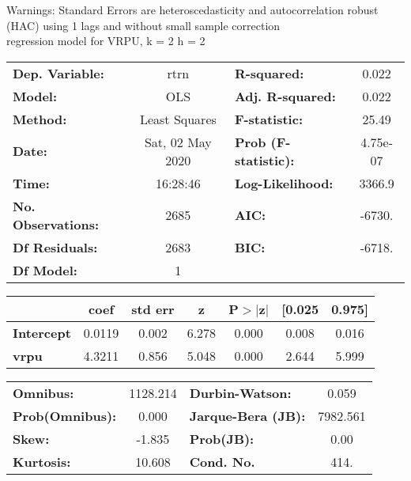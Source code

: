 Warnings: \newline
 [1] Standard Errors are heteroscedasticity and autocorrelation robust (HAC) using 1 lags and without small sample correction\\ 

regression model for VRPU, k = 2 h = 2\begin{center}
\begin{tabular}{lclc}
\toprule
\textbf{Dep. Variable:}    &       rtrn       & \textbf{  R-squared:         } &     0.022   \\
\textbf{Model:}            &       OLS        & \textbf{  Adj. R-squared:    } &     0.022   \\
\textbf{Method:}           &  Least Squares   & \textbf{  F-statistic:       } &     25.49   \\
\textbf{Date:}             & Sat, 02 May 2020 & \textbf{  Prob (F-statistic):} &  4.75e-07   \\
\textbf{Time:}             &     16:28:46     & \textbf{  Log-Likelihood:    } &    3366.9   \\
\textbf{No. Observations:} &        2685      & \textbf{  AIC:               } &    -6730.   \\
\textbf{Df Residuals:}     &        2683      & \textbf{  BIC:               } &    -6718.   \\
\textbf{Df Model:}         &           1      & \textbf{                     } &             \\
\bottomrule
\end{tabular}
\begin{tabular}{lcccccc}
                   & \textbf{coef} & \textbf{std err} & \textbf{z} & \textbf{P$> |$z$|$} & \textbf{[0.025} & \textbf{0.975]}  \\
\midrule
\textbf{Intercept} &       0.0119  &        0.002     &     6.278  &         0.000        &        0.008    &        0.016     \\
\textbf{vrpu}      &       4.3211  &        0.856     &     5.048  &         0.000        &        2.644    &        5.999     \\
\bottomrule
\end{tabular}
\begin{tabular}{lclc}
\textbf{Omnibus:}       & 1128.214 & \textbf{  Durbin-Watson:     } &    0.059  \\
\textbf{Prob(Omnibus):} &   0.000  & \textbf{  Jarque-Bera (JB):  } & 7982.561  \\
\textbf{Skew:}          &  -1.835  & \textbf{  Prob(JB):          } &     0.00  \\
\textbf{Kurtosis:}      &  10.608  & \textbf{  Cond. No.          } &     414.  \\
\bottomrule
\end{tabular}
\end{center}

